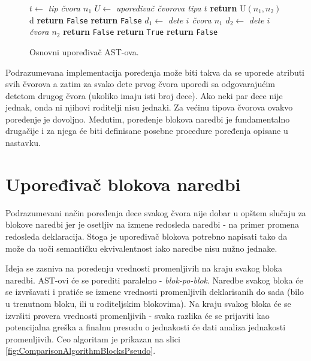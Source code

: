 \begin{figure}[!h]
\begin{algorithmic}[1]
    \State $t \gets$ \emph{tip čvora $n_1$}
        \State $U \gets$ \emph{upoređivač čvorova tipa $t$}
        \State \textbf{return} U$(n_1, n_2)$
    \Else
        d
            \State \textbf{return} \texttt{False}
        \Else        
                \State \textbf{return} \texttt{False}
            \EndIf
                \State $d_1 \gets $ \emph{dete $i$ čvora $n_1$}
                \State $d_2 \gets $ \emph{dete $i$ čvora $n_2$}
                    \State \textbf{return} \texttt{False}
                \EndIf
            \EndFor
            \State \textbf{return} \texttt{True}
        \EndIf
    \EndIf
\Else
    \State \textbf{return} \texttt{False}
\EndIf
\EndProcedure
\end{algorithmic}
\caption{Osnovni upoređivač AST-ova.}
\label{fig:ComparisonAlgorithmPseudo}
\end{figure}

Podrazumevana implementacija poređenja može biti takva da se uporede atributi svih čvorova a zatim za svako dete prvog čvora uporedi sa odgovarajućim detetom drugog čvora (ukoliko imaju isti broj dece). Ako neki par dece nije jednak, onda ni njihovi roditelji nisu jednaki. Za većinu tipova čvorova ovakvo poređenje je dovoljno. Međutim, poređenje blokova naredbi je fundamentalno drugačije i za njega će biti definisane posebne procedure poređenja opisane u nastavku.


\section{Upoređivač blokova naredbi}
\label{sec:ASTComparingBlocks}

Podrazumevani način poređenja dece svakog čvora nije dobar u opštem slučaju za blokove naredbi jer je osetljiv na izmene redosleda naredbi - na primer promena redosleda deklaracija. Stoga je upoređivač blokova potrebno napisati tako da može da uoči semantičku ekvivalentnost iako naredbe nisu nužno jednake.

Ideja se zasniva na poređenju vrednosti promenljivih na kraju svakog bloka naredbi. AST-ovi će se porediti paralelno - \emph{blok-po-blok}. Naredbe svakog bloka će se izvršavati i pratiće se izmene vrednosti promenljivih deklarisanih do sada (bilo u trenutnom bloku, ili u roditeljskim blokovima). Na kraju svakog bloka će se izvršiti provera vrednosti promenljivih - svaka razlika će se prijaviti kao potencijalna greška a finalnu presudu o jednakosti će dati analiza jednakosti promenljivih. Ceo algoritam je prikazan na slici \ref{fig:ComparisonAlgorithmBlocksPseudo}.

